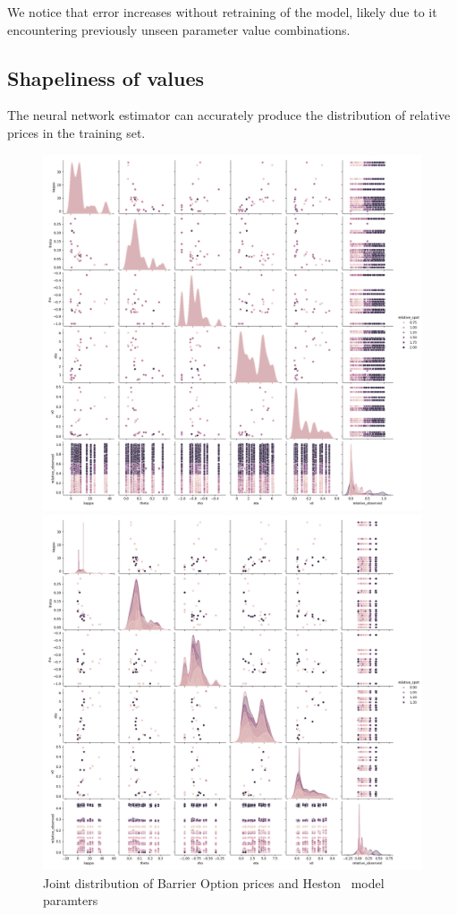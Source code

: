 \documentclass[11pt]{article}
\begin{document}
		We notice that error increases without retraining of the model, likely due to it encountering previously unseen parameter value combinations.
		
	\subsection{Shapeliness of values}
		The neural network estimator can accurately produce the distribution of relative prices in the training set.
		\begin{figure}[htbp]
			\centering
			\begin{minipage}{0.48\textwidth}
				\centering
				\includegraphics[width=\textwidth]{Shapely Barriers.png}
				\caption{Joint distribution of Barrier Option prices and Heston~\cite{heston_1993_a} model paramters}
				\label{fig:shapelyBarriers}
			\end{minipage}%
			\hfill
			\begin{minipage}{0.48\textwidth}
				\centering
				\includegraphics[width=\textwidth]{Shapely Asians.png}

\end{minipage}
\end{figure}
\end{document}
